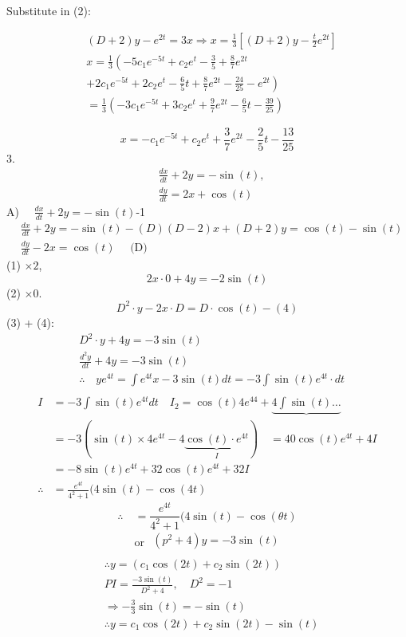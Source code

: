 \documentclass[12pt, a4paper]{article}
\begin{document}
Substitute in (2):

$$
\begin{aligned}
& (D+2) y-e^{2 t}=3 x \Rightarrow x=\frac{1}{3}\left[(D+2) y-\frac{t}{2} e^{2 t}\right] \\
& x=\frac{1}{3}\left(-5 c_{1} e^{-5 t}+c_{2} e^{t}-\frac{3}{5}+\frac{8}{7} e^{2 t}\right. \\
& \left.+2 c_{1} e^{-5 t}+2 c_{2} e^{t}-\frac{6}{5} t+\frac{8}{7} e^{2 t}-\frac{24}{25}-e^{2 t}\right) \\
& =\frac{1}{3}\left(-3 c_{1} e^{-5 t}+3 c_{2} e^{t}+\frac{9}{7} e^{2 t}-\frac{6}{5} t-\frac{39}{25}\right)
\end{aligned}
$$

$$
x=-c_1 e^{-5 t}+c_2 e^t+\frac{3}{7} e^{2 t}-\frac{2}{5} t-\frac{13}{25}
$$
3.
$$
\begin{aligned}
& \frac{d x}{d t}+2 y=-\sin (t), \\
& \frac{d y}{d t}=2 x+\cos (t)
\end{aligned}
$$
A) $\quad \frac{d x}{d t}+2 y=-\sin (t)$-1
$$
\begin{aligned}
& \frac{d x}{d t}+2 y=-\sin (t)-(D)(D-2) x+(D+2) y=\cos (t)-\sin (t) \\
& \frac{d y}{d t}-2 x=\cos (t) \quad \text { (D) }
\end{aligned}
$$
(1) $\times 2$,
$$
2 x \cdot 0+4 y=-2 \sin (t)
$$
(2) $\times 0$.
$$
D^2 \cdot y-2 x \cdot D=D \cdot \cos (t)-(4)
$$
(3) + (4):
$$
\begin{aligned}
& D^2 \cdot y+4 y=-3 \sin (t) \\
& \frac{d^2 y}{d t}+4 y=-3 \sin (t) \\
& \therefore \quad y e^{4 t}=\int e^{4 t} x-3 \sin (t) d t=-3 \int \sin (t) e^{4 t} \cdot d t \\
&
\end{aligned}
$$
$$
\begin{aligned}
I & =-3 \int \sin (t) e^{4 t} d t \quad I_2=\cos (t) 4 e^{44}+\underbrace{4 \int \sin (t) \ldots} \\
& =-3(\sin (t) \times 4 e^{4 t}-4 \underbrace{\cos (t) \cdot e^{4 t}}_I) \quad=40 \cos (t) e^{4 t}+4 I \\
& =-8 \sin (t) e^{4 t}+32 \cos (t) e^{4 t}+32 I \\
\therefore & =\frac{e^{4 t}}{4^2+1}(4 \sin (t)-\cos (4 t)
\end{aligned}
$$
$$
\therefore \quad=\frac{e^{4 t}}{4^2+1}(4 \sin (t)-\cos (\theta t)
$$
$$
\text { or } \begin{aligned}
\left(p^2+4\right) y=-3 \sin (t) \\
\end{aligned}
$$
$$
\begin{aligned}
& \therefore y=\left(c_1 \cos (2 t)+c_2 \sin (2 t)\right) \\
& P I=\frac{-3 \sin (t)}{D^2+4}, \quad D^2=-1 \\
& \Rightarrow-\frac{3}{3} \sin (t)=-\sin (t) \\
& \therefore y=c_1 \cos (2 t)+c_2 \sin (2 t)-\sin (t)
\end{aligned}
$$
\end{document}
